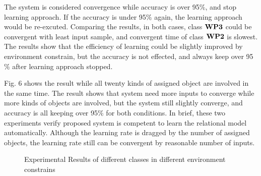 \documentclass[journal]{IEEEtran}
\begin{document}
The system is considered convergence while accuracy is over 95$\%$, and stop learning approach. If the accuracy is under 95$\%$ again, the learning approach would be re-excuted. Comparing the results, in both cases, class $\bf{WP3}$ could be convergent with least input sample, and convergent time of class $\bf{WP2}$ is slowest. The results show that the efficiency of learning could be slightly improved by environment constrain, but the accuracy is not effected, and always keep over 95$\%$ after learning approach stopped. 
 
Fig. 6 shows the result while all twenty kinds of assigned object are involved in the same time. The result shows that system need more inputs to converge while more kinds of objects are involved, but the system still slightly converge, and accuracy is all keeping over 95$\%$ for both conditions. In brief, these two experiments verify proposed system is competent to learn the relational model automatically. Although the learning rate is dragged by the number of assigned objects, the learning rate still can be convergent by reasonable number of inputs. 


 
\begin{figure}[!t]
\centering


\caption{Experimental Results of different classes in different environment constrains}

\end{figure}
\end{document}
